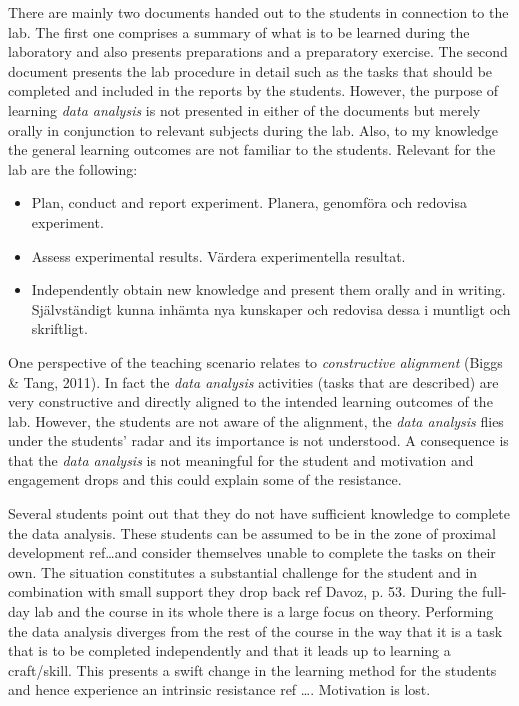 \documentclass[]{article}
\begin{document}
There are mainly two documents handed out to the students in connection to the lab.
The first one comprises a summary of what is to be learned during the laboratory and also presents preparations and a preparatory exercise.
The second document presents the lab procedure in detail such as the tasks that should be completed and included in the reports by the students.
However, the purpose of learning {\it data analysis} is not presented in either of the documents but merely orally in conjunction to relevant subjects during the lab.
Also, to my knowledge the general learning outcomes are not familiar to the students.
Relevant for the lab are the following:
\begin{itemize}
  \item Plan, conduct and report experiment. Planera, genomföra och redovisa experiment.
  \item Assess experimental results. Värdera experimentella resultat.
  \item Independently obtain new knowledge and present them orally and in writing. Självständigt kunna inhämta nya kunskaper och redovisa dessa i muntligt och skriftligt.
\end{itemize}
One perspective of the teaching scenario relates to {\it constructive alignment} \cite{biggs} (Biggs \& Tang, 2011).
In fact the {\it data analysis} activities (tasks that are described) are very constructive and directly aligned to the intended learning outcomes of the lab.
However, the students are not aware of the alignment, the {\it data analysis} flies under the students' radar and its importance is not understood.
A consequence is that the {\it data analysis} is not meaningful for the student and motivation and engagement drops \cite{illeris} and this could explain some of the resistance.

Several students point out that they do not have sufficient knowledge to complete the data analysis.
These students can be assumed to be in the zone of proximal development ref\dots and consider themselves unable to complete the tasks on their own.
The situation constitutes a substantial challenge for the student and in combination with small support they drop back ref Davoz, p. 53.
During the full-day lab and the course in its whole there is a large focus on theory.
Performing the data analysis diverges from the rest of the course in the way that it is a task that is to be completed independently and that it leads up to learning a craft/skill.
This presents a swift change in the learning method for the students and hence experience an intrinsic resistance ref \dots.
Motivation is lost.
\end{document}
